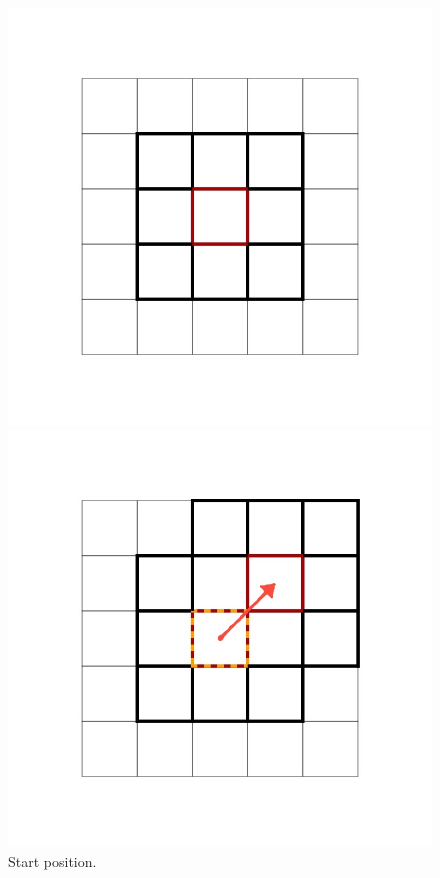 \documentclass[class=article, crop=false]{standalone}
\begin{document}
\begin{figure}[ht]
\begin{minipage}[c]{0.33\linewidth}
\centering

\includegraphics[scale=0.17]{draw/Thesis_plots/Thesis_D2Q9andQ9_crop/Thesis_D2Q9andQ9.001}

\captionsetup{width=.8\linewidth}
\caption{Start position.}
\label{fig:Thesis_D2Q9andQ9.001}
\end{minipage}
\begin{minipage}[c]{0.33\linewidth}
\centering

\includegraphics[scale=0.17]{draw/Thesis_plots/Thesis_D2Q9andQ9_crop/Thesis_D2Q9andQ9.002}


\end{minipage}
\end{figure}
\end{document}

